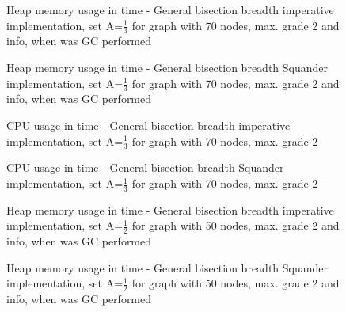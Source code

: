 \documentclass[11pt,twoside,a4paper]{book}
\begin{document}
\begin{figure}
\begin{center}

\caption{Heap memory usage in time - General bisection breadth imperative
implementation, set A=$\frac{1}{3}$ for graph with 70 nodes, max. grade 2 and
info, when was GC performed}
\label{fig:gbbIHeap90213}
\end{center}
\end{figure}


\begin{figure}
\begin{center}

\caption{Heap memory usage in time - General bisection breadth Squander
implementation, set A=$\frac{1}{3}$ for graph with 70 nodes, max. grade 2 and
info, when was GC performed}
\label{fig:gbbSHeap90213}
\end{center}
\end{figure}



\begin{figure}
\begin{center}

\caption{CPU usage in time - General bisection breadth imperative
implementation, set A=$\frac{1}{3}$ for graph with 70 nodes, max. grade 2}
\label{fig:gbbICpu70213}
\end{center}
\end{figure}




\begin{figure}
\begin{center}

\caption{CPU usage in time - General bisection breadth Squander
implementation, set A=$\frac{1}{3}$ for graph with 70 nodes, max. grade 2}
\label{fig:gbbSCpu70213}
\end{center}
\end{figure}


\begin{figure}
\begin{center}

\caption{Heap memory usage in time - General bisection breadth imperative
implementation, set A=$\frac{1}{2}$ for graph with 50 nodes, max. grade 2 and
info, when was GC performed}
\label{fig:gbbIHeap50212}
\end{center}
\end{figure}

\begin{figure}
\begin{center}

\caption{Heap memory usage in time - General bisection breadth Squander
implementation, set A=$\frac{1}{2}$ for graph with 50 nodes, max. grade 2 and
info, when was GC performed}
\label{fig:gbbSHeap50212}
\end{center}
\end{figure}
\end{document}
